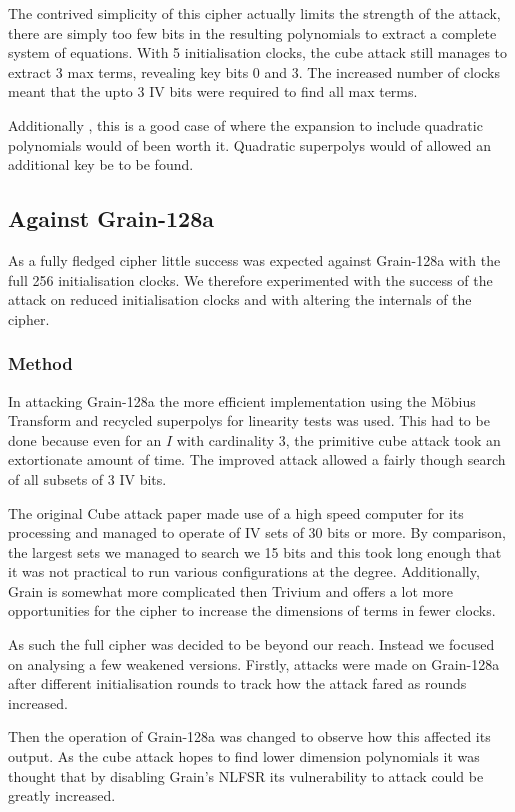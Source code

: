 \documentclass{report}
\let\Oldsubsection\subsection
\renewcommand{\subsection}{\FloatBarrier\Oldsubsection}
\let\Oldsubsubsection\subsubsection
\renewcommand{\subsubsection}{\FloatBarrier\Oldsubsubsection}
\begin{document}
The contrived simplicity of this cipher actually limits the strength of the attack, there are simply too few bits in the resulting polynomials to extract a complete system of equations. With 5 initialisation clocks, the cube attack still manages to extract 3 max terms, revealing key bits 0 and 3. The increased number of clocks meant that the upto 3 IV bits were required to find all max terms.

Additionally , this is a good case of where the expansion to include quadratic polynomials would of been worth it. Quadratic superpolys would of allowed an additional key be to be found.
\subsection{Against Grain-128a}
As a fully fledged cipher little success was expected against Grain-128a with the full 256 initialisation clocks. We therefore experimented with the success of the attack on reduced initialisation clocks and with altering the internals of the cipher.
\subsubsection{Method}
In attacking Grain-128a the more efficient implementation using the M\"{o}bius Transform and recycled superpolys for linearity tests was used. This had to be done because even for an $I$ with cardinality 3, the primitive cube attack took an extortionate amount of time. The improved attack allowed a fairly though search of all subsets of 3 IV bits.

The original Cube attack paper made use of a high speed computer for its processing and managed to operate of IV sets of 30 bits or more. By comparison, the largest sets we managed to search we 15 bits and this took long enough that it was not practical to run various configurations at the degree. Additionally, Grain is somewhat more complicated then Trivium and offers a lot more opportunities for the cipher to increase the dimensions of terms in fewer clocks.

As such the full cipher was decided to be beyond our reach. Instead we focused on analysing a few weakened versions. Firstly, attacks were made on Grain-128a after different initialisation rounds to track how the attack fared as rounds increased.

Then the operation of Grain-128a was changed to observe how this affected its output. As the cube attack hopes to find lower dimension polynomials it was thought that by disabling Grain's NLFSR its vulnerability to attack could be greatly increased.
\end{document}
